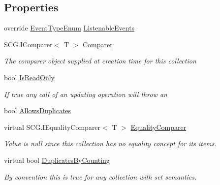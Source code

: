 \subsection*{Properties}
\begin{DoxyCompactItemize}
\item 
override \hyperlink{namespace_c5_a9143bfd561fffa025d21561674758008}{Event\+Type\+Enum} \hyperlink{class_c5_1_1_interval_heap_aea675c936b84378eaa72d208a80605dd}{Listenable\+Events}
\item 
S\+C\+G.\+I\+Comparer$<$ T $>$ \hyperlink{class_c5_1_1_interval_heap_a0da8aaabae59ac97119bff56d16e6a87}{Comparer}
\begin{DoxyCompactList}\small\item\em The comparer object supplied at creation time for this collection \end{DoxyCompactList}\item 
bool \hyperlink{class_c5_1_1_interval_heap_a0c7d60732701b904a277b1c776224fbf}{Is\+Read\+Only}
\begin{DoxyCompactList}\small\item\em If true any call of an updating operation will throw an \end{DoxyCompactList}\item 
bool \hyperlink{class_c5_1_1_interval_heap_a3f04b4e3b21b55967adcb6cf7f3252dc}{Allows\+Duplicates}
\item 
virtual S\+C\+G.\+I\+Equality\+Comparer$<$ T $>$ \hyperlink{class_c5_1_1_interval_heap_a0c8af0d3e8f557d3e083513a2774676a}{Equality\+Comparer}
\begin{DoxyCompactList}\small\item\em Value is null since this collection has no equality concept for its items. \end{DoxyCompactList}\item 
virtual bool \hyperlink{class_c5_1_1_interval_heap_a7e944979e8700149ef1605b5ff7019e9}{Duplicates\+By\+Counting}
\begin{DoxyCompactList}\small\item\em By convention this is true for any collection with set semantics. \end{DoxyCompactList}\item 

\end{DoxyCompactItemize}
